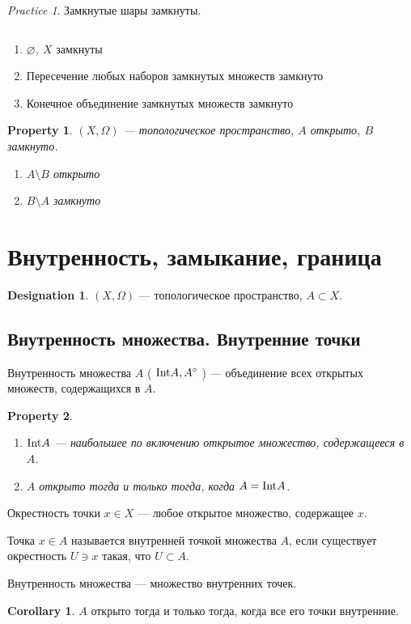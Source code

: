 \documentclass[11pt]{book}
\newcommand{\Int}{{\mathop{\text{\rm Int}}}}
\theoremstyle{definition}
\theoremstyle{plain}
\theoremstyle{plain}
\newtheorem*{prop}{Property}
\theoremstyle{definition}
\newtheorem*{cor}{Corollary}
\newtheorem*{name}{Designation}
\theoremstyle{remark}
\newtheorem*{prac}{Practice}
\begin{document}
\begin{prac}
    Замкнутые шары замкнуты.
\end{prac}
\begin{thm}
    $ $
    \begin{enumerate}
	\item $ \varnothing, ~ X$ замкнуты
	\item Пересечение любых наборов замкнутых множеств замкнуто
	\item Конечное объединение замкнутых множеств замкнуто
    \end{enumerate}
\end{thm}
\begin{prop}
    $ (X, \Omega ) $ --- топологическое пространство, $ A$ открыто,  $ B$ замкнуто.
    \begin{enumerate}
	\item $ A \setminus B$ открыто
	\item $ B \setminus A$ замкнуто
    \end{enumerate}
\end{prop}
\section{Внутренность, замыкание, граница}
\begin{name}
    $ (X, \Omega )$ --- топологическое пространство, $ A \subset X$.
\end{name}
\subsection{Внутренность множества. Внутренние точки}
\begin{defn}
    Внутренность множества $ A$ ( $ \Int A, A^{\circ}$ ) --- объединение всех открытых множеств, содержащихся в $ A$.
\end{defn}
\begin{prop}
    $ $
    \begin{enumerate}
	\item $ \Int A$ --- наибольшее по включению открытое множество, содержащееся в  $ A$.
	\item  $ A$ открыто  тогда и только тогда, когда $ A = \Int A$.
    \end{enumerate}
\end{prop}
\begin{defn}
    Окрестность точки $ x \in X$ --- любое  открытое множество, содержащее $ x$.
\end{defn}
\begin{defn}
    Точка $ x \in A$ называется внутренней точкой множества $ A$, если существует окрестность  $ U \ni x$ такая, что  $ U \subset A$.
\end{defn}
\begin{thm}
    Внутренность множества --- множество внутренних точек.
\end{thm}
\begin{cor}
    $ A$ открыто  тогда и только тогда, когда все его точки внутренние.
\end{cor}
\end{document}
